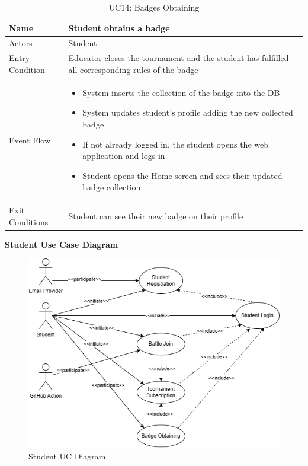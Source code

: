 \begin{enumerate}
   \begin{table}[H]
       \centering
       \begin{tabular}{|l|m{11cm}|}
        \hline
            Name & Student obtains a badge\\
        \hline
            Actors & Student \\
        \hline
            Entry Condition & Educator closes the tournament and the student has fulfilled all corresponding rules of the badge\\
        \hline
            Event Flow & 
            \begin{itemize}
                \item System inserts the collection of the badge into the DB
                \item System updates student's profile adding the new collected badge
                \item If not already logged in, the student opens the web application and logs in
                \item Student opens the Home screen and sees their updated badge collection
            \end{itemize}\\
        \hline
            Exit Conditions & Student can see their new badge on their profile\\
        \hline
       \end{tabular}
       \caption{UC14: Badges Obtaining}
       \label{tab:uc14}
   \end{table}
   
\end{enumerate}

\newpage

\textbf{Student Use Case Diagram}
\begin{figure}[H]
    \centering
    \includegraphics[width=1\linewidth]{Images/UC_Student.png}
    \caption{Student UC Diagram}
    \label{fig:uc_student}
\end{figure}

